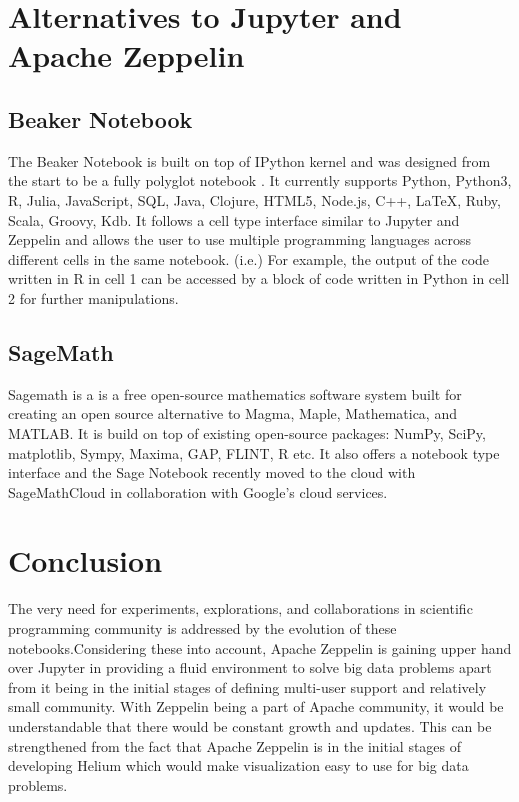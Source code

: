 \documentclass[9pt,twocolumn,twoside]{../../styles/osajnl}
\begin{document}
\section{Alternatives to Jupyter and Apache Zeppelin}
\subsection{Beaker Notebook}
The Beaker Notebook is built on top of IPython kernel and  was designed from the start to be a fully polyglot notebook \cite{www-beaker}. It currently supports Python, Python3, R, Julia, JavaScript, SQL, Java, Clojure, HTML5, Node.js, C++, LaTeX, Ruby, Scala, Groovy, Kdb. It follows a cell type interface similar to Jupyter and Zeppelin and allows the user to use multiple programming languages across different cells in the same notebook. (i.e.) For example, the output of the code written in R in cell 1 can be accessed by a block of code written in Python in cell 2 for further manipulations.

\subsection{SageMath}
Sagemath is a is a free open-source mathematics software system \cite{www-sagemath} built for creating an open source alternative to Magma, Maple, Mathematica, and MATLAB. It is build on top of  existing open-source packages: NumPy, SciPy, matplotlib, Sympy, Maxima, GAP, FLINT, R etc. It also offers a notebook type interface and the Sage Notebook recently moved to the cloud with SageMathCloud in collaboration with Google’s cloud services.

\section{Conclusion}

The very need for experiments, explorations, and collaborations in scientific programming community is addressed by the evolution of these notebooks.Considering these into account, Apache Zeppelin is gaining upper hand over Jupyter in providing a fluid environment to solve big data problems apart from it being in the initial stages of defining multi-user support and relatively small community. With Zeppelin being a part of Apache community, it would be understandable that there would be constant growth and updates. This can be strengthened from the fact that Apache Zeppelin is in the initial stages of developing Helium which would make visualization easy to use for big data problems.


\end{document}
